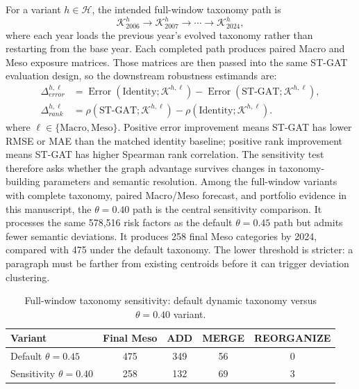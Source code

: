 \documentclass[11pt, a4paper]{article}
\begin{document}
For a variant $h\in\mathcal{H}$, the intended full-window taxonomy path is
\begin{equation}
\mathcal{K}^{h}_{2006}\rightarrow\mathcal{K}^{h}_{2007}\rightarrow\cdots\rightarrow\mathcal{K}^{h}_{2024},
\end{equation}
where each year loads the previous year's evolved taxonomy rather than restarting from the base year. Each completed path produces paired Macro and Meso exposure matrices. Those matrices are then passed into the same ST-GAT evaluation design, so the downstream robustness estimands are:
\begin{equation}
\begin{aligned}
\Delta^{h,\ell}_{error}
&=
\operatorname{Error}\left(\text{Identity};\mathcal{K}^{h,\ell}\right)
-\operatorname{Error}\left(\text{ST-GAT};\mathcal{K}^{h,\ell}\right),\\
\Delta^{h,\ell}_{rank}
&=
\rho\left(\text{ST-GAT};\mathcal{K}^{h,\ell}\right)
-\rho\left(\text{Identity};\mathcal{K}^{h,\ell}\right).
\end{aligned}
\end{equation}
where $\ell\in\{\text{Macro},\text{Meso}\}$. Positive error improvement means ST-GAT has lower RMSE or MAE than the matched identity baseline; positive rank improvement means ST-GAT has higher Spearman rank correlation. The sensitivity test therefore asks whether the graph advantage survives changes in taxonomy-building parameters and semantic resolution. Among the full-window variants with complete taxonomy, paired Macro/Meso forecast, and portfolio evidence in this manuscript, the $\theta=0.40$ path is the central sensitivity comparison. It processes the same 578,516 risk factors as the default $\theta=0.45$ path but admits fewer semantic deviations. It produces 258 final Meso categories by 2024, compared with 475 under the default taxonomy. The lower threshold is stricter: a paragraph must be farther from existing centroids before it can trigger deviation clustering.

\begin{table}[H]
\centering
\caption{Full-window taxonomy sensitivity: default dynamic taxonomy versus $\theta=0.40$ variant.}
\label{tab:taxonomy_full_window_sensitivity}
\vspace{0.2cm}
\renewcommand{\arraystretch}{1.18}
\begin{tabular}{lcccc}
\toprule
\textbf{Variant} & \textbf{Final Meso} & \textbf{ADD} & \textbf{MERGE} & \textbf{REORGANIZE} \\
\midrule
Default $\theta=0.45$ & 475 & 349 & 56 & 0 \\
Sensitivity $\theta=0.40$ & 258 & 132 & 69 & 3 \\
\bottomrule
\end{tabular}
\end{table}
\end{document}
